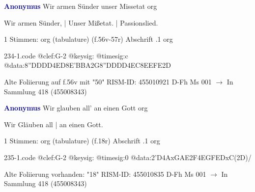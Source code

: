 \documentclass[twocolumn]{book}
\begin{document}
\newline \par \vspace{7pt} \textcolor{darkblue}{\textbf{Anonymus  }}
\newline Wir armen Sünder unser Missetat
\newline org
\newline \begin{itshape}[f.56v, at left:] Wir armen Sünder, | Unser Mißetat. | Passionslied.\end{itshape} 
\newline \textcolor{darkblue}{}  1 Stimmen: org (tabulature)  (f.56v-57r)
\newline Abschrift
.1  org  
\begin{filecontents*}{234-1.code}
@clef:G-2
@keysig:
@timesig:c
@data:{8''DDDD}4ED{8E'BBA}2G{8''DDDD}4EC{8EEFE}2D
\end{filecontents*}
\newline
%
\newline Alte Foliierung auf f.56v mit "50"
\newline RISM-ID: 455010921
\newline D-Fh  Ms 001
\newline $\rightarrow$ In Sammlung 418 (455008343)
      
\newline \par \vspace{7pt} \textcolor{darkblue}{\textbf{Anonymus  }}
\newline Wir glauben all' an einen Gott
\newline org
\newline \begin{itshape}[f.18r, at left:] Wir Gläuben all | an einen Gott.\end{itshape} 
\newline \textcolor{darkblue}{}  1 Stimmen: org (tabulature)  (f.18r)
\newline Abschrift
.1  org  
\begin{filecontents*}{235-1.code}
@clef:G-2
@keysig:
@timesig:0
@data:2'D4AxGAE2F4EGFEDxC(2D)/
\end{filecontents*}
\newline
%
\newline Alte Foliierung vorhanden: "18"
\newline RISM-ID: 455010835
\newline D-Fh  Ms 001
\newline $\rightarrow$ In Sammlung 418 (455008343)
      
\end{document}
